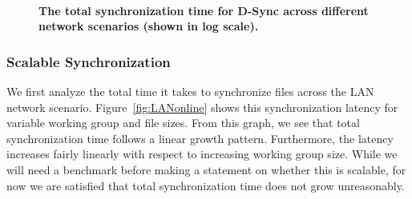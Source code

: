 \begin{figure}[t]
\centering
{}
~~~~
\caption{\textbf{The total synchronization time for D-Sync across different network scenarios (shown in log scale).}}
\end{figure}

\subsubsection{Scalable Synchronization}
We first analyze the total time it takes to synchronize files
across the LAN network scenario.  Figure~\ref{fig:LANonline} 
shows this synchronization latency for variable working group and
file sizes. From this graph,
we see that total synchronization time follows a linear growth pattern.
Furthermore, the latency increases fairly linearly with respect
to increasing working group size.
While we will need a benchmark before making a statement
on whether this is scalable,
for now we are satisfied that total synchronization time
    does not grow unreasonably.

